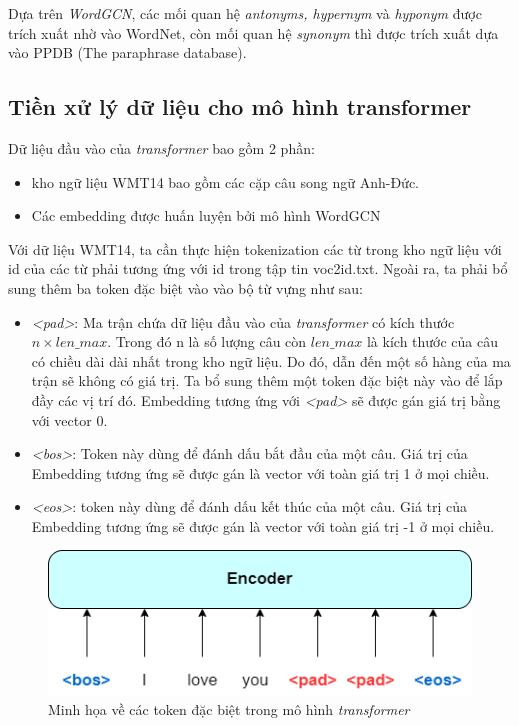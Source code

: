 Dựa trên \textit{WordGCN}, các mối quan hệ \textit{antonyms, hypernym} và \textit{hyponym} được trích xuất nhờ vào WordNet, còn mối quan hệ \textit{synonym} thì được trích xuất dựa vào PPDB (The paraphrase database).

\subsection{Tiền xử lý dữ liệu cho mô hình transformer}

Dữ liệu đầu vào của \textit{transformer} bao gồm 2 phần:
\begin{itemize}
	\item kho ngữ liệu WMT14 bao gồm các cặp câu song ngữ Anh-Đức.
	\item Các embedding được huấn luyện bởi mô hình WordGCN
\end{itemize}

Với dữ liệu WMT14, ta cần thực hiện tokenization các từ trong kho ngữ liệu với id của các từ phải tương ứng với id trong tập tin voc2id.txt. Ngoài ra, ta phải bổ sung thêm ba token đặc biệt vào vào bộ từ vựng như sau:
\begin{itemize}
	\item \textit{<pad>}: Ma trận chứa dữ liệu đầu vào của  \textit{transformer}  có kích thước $n \times len\_max$. Trong đó n là số lượng câu còn $len\_max$ là kích thước của câu có chiều dài dài nhất trong kho ngữ liệu. Do đó, dẫn đến một số hàng của ma trận sẽ không có giá trị. Ta bổ sung thêm một token đặc biệt này vào để lắp đầy các vị trí đó. Embedding tương ứng với \textit{<pad>} sẽ được gán giá trị bằng với vector 0.
	\item \textit{<bos>}: Token này dùng để đánh dấu bắt đầu của một câu. Giá trị của Embedding tương ứng sẽ được gán là vector với toàn giá trị 1 ở mọi chiều.
	\item \textit{<eos>}: token này dùng để đánh dấu kết thúc của một câu. Giá trị của Embedding tương ứng sẽ được gán là vector với toàn giá trị -1 ở mọi chiều.
\end{itemize}

\begin{figure}[H]
    \begin{center}
        \includegraphics[scale=0.85]{images/special-token}
        \caption{Minh họa về các token đặc biệt trong mô hình \textit{transformer} }
        \label{fig:special token}
    \end{center}
\end{figure}

